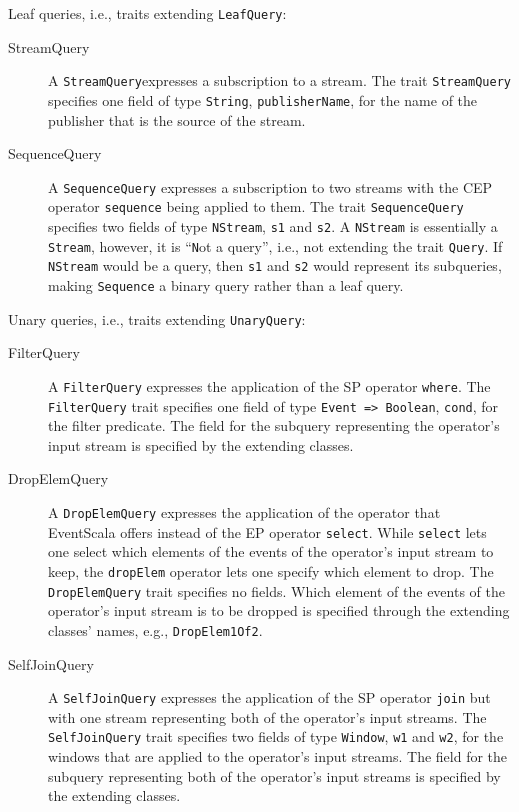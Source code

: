 \documentclass[article, type=bsc, colorback, accentcolor=tud8b, parskip=half, bibliography=totocnumbered]{tudthesis}
\begin{document}
Leaf queries, i.e., traits extending \lstinline{LeafQuery}:

\begin{description}

\item[StreamQuery]
A \lstinline{StreamQuery}expresses a subscription to a stream.
The trait \lstinline{StreamQuery} specifies one field of type \lstinline{String}, \lstinline{publisherName}, for the name of the publisher that is the source of the stream.

\item[SequenceQuery]
A \lstinline{SequenceQuery} expresses a subscription to two streams with the CEP operator \lstinline{sequence} being applied to them.
The trait \lstinline{SequenceQuery} specifies two fields of type \lstinline{NStream}, \lstinline{s1} and \lstinline{s2}.
A \lstinline{NStream} is essentially a \lstinline{Stream}, however, it is ``\lstinline{N}ot a query'', i.e., not extending the trait \lstinline{Query}.
If \lstinline{NStream} would be a query, then \lstinline{s1} and \lstinline{s2} would represent its subqueries, making \lstinline{Sequence} a binary query rather than a leaf query.

\end{description}

Unary queries, i.e., traits extending \lstinline{UnaryQuery}:

\begin{description}

\item[FilterQuery]
A \lstinline{FilterQuery} expresses the application of the SP operator \lstinline{where}.
The \lstinline{FilterQuery} trait specifies one field of type \lstinline{Event => Boolean}, \lstinline{cond}, for the filter predicate.
The field for the subquery representing the operator's input stream is specified by the extending classes.

\item[DropElemQuery]
A \lstinline{DropElemQuery} expresses the application of the operator that EventScala offers instead of the EP operator \lstinline{select}.
While \lstinline{select} lets one select which elements of the events of the operator's input stream to keep, the \lstinline{dropElem} operator lets one specify which element to drop.
The \lstinline{DropElemQuery} trait specifies no fields.
Which element of the events of the operator's input stream is to be dropped is specified through the extending classes' names, e.g., \lstinline{DropElem1Of2}.

\item[SelfJoinQuery]
A \lstinline{SelfJoinQuery} expresses the application of the SP operator \lstinline{join} but with one stream representing both of the operator's input streams.
The \lstinline{SelfJoinQuery} trait specifies two fields of type \lstinline{Window}, \lstinline{w1} and \lstinline{w2}, for the windows that are applied to the operator's input streams.
The field for the subquery representing both of the operator's input streams is specified by the extending classes.

\end{description}
\end{document}
